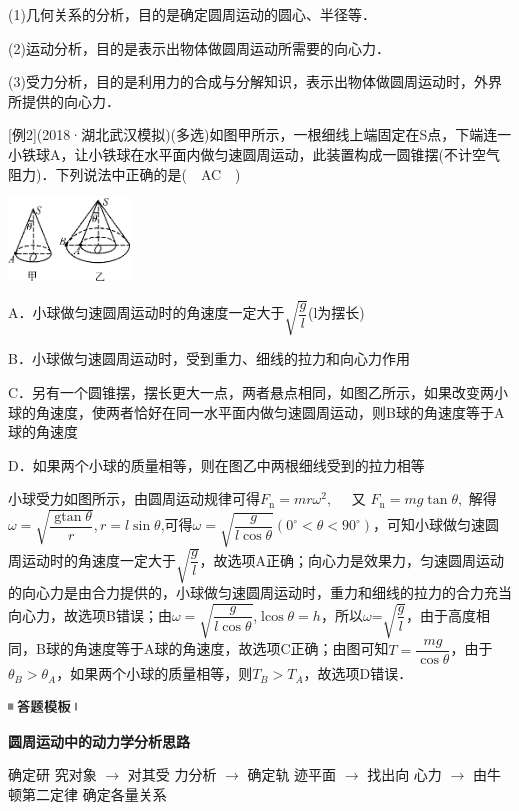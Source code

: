 \documentclass[cn,10.5pt,chinese,mac,chinesefont=founder]{elegantbook}
\begin{document}
(1)几何关系的分析，目的是确定圆周运动的圆心、半径等．

(2)运动分析，目的是表示出物体做圆周运动所需要的向心力．

(3)受力分析，目的是利用力的合成与分解知识，表示出物体做圆周运动时，外界所提供的向心力．

{[}例2{]}(2018·湖北武汉模拟)(多选)如图甲所示，一根细线上端固定在S点，下端连一小铁球A，让小铁球在水平面内做匀速圆周运动，此装置构成一圆锥摆(不计空气阻力)．下列说法中正确的是(　AC　)

\begin{center}\includegraphics[width=1.26667in,height=0.86667in]{media/image184.png}\end{center}

A．小球做匀速圆周运动时的角速度一定大于$\sqrt{\dfrac{g}{l}}$(l为摆长)

B．小球做匀速圆周运动时，受到重力、细线的拉力和向心力作用

C．另有一个圆锥摆，摆长更大一点，两者悬点相同，如图乙所示，如果改变两小球的角速度，使两者恰好在同一水平面内做匀速圆周运动，则B球的角速度等于A球的角速度

D．如果两个小球的质量相等，则在图乙中两根细线受到的拉力相等
\begin{solution}
	小球受力如图所示，由圆周运动规律可得$F_{\mathrm{n}}=m r \omega^{2}, \quad$ 又 $F_{\mathrm{n}}=m g \tan \theta,$ 解得 $\omega=\sqrt{\dfrac{\operatorname{gtan} \theta}{r}}, r=l \sin \theta$,可得$\omega=\sqrt{\dfrac{g}{l \cos \theta}}\left(0^{\circ}<\theta<90^{\circ}\right)$，可知小球做匀速圆周运动时的角速度一定大于$\sqrt{\dfrac{g}{l}}$，故选项A正确；向心力是效果力，匀速圆周运动的向心力是由合力提供的，小球做匀速圆周运动时，重力和细线的拉力的合力充当向心力，故选项B错误；由$\omega=\sqrt{\dfrac{g}{l \cos \theta}}$,$\operatorname{lcos} \theta=h$，所以$\omega$=$\sqrt{\dfrac{g}{l}}$，由于高度相同，B球的角速度等于A球的角速度，故选项C正确；由图可知$T=\dfrac{m g}{\cos \theta}$，由于$\theta_{B}>\theta_{A}$，如果两个小球的质量相等，则$T_{B}>T_{A}$，故选项D错误．
\end{solution}

\begin{center}\includegraphics[width=0.71667in,height=0.13333in]{media/image25.png}

\textbf{圆周运动中的动力学分析思路}
\end{center}
确定研
究对象 $\rightarrow$ 对其受
力分析 $\rightarrow$ 确定轨
迹平面 $\rightarrow$ 找出向
心力 $\rightarrow$ 由牛顿第二定律
确定各量关系
\end{document}
